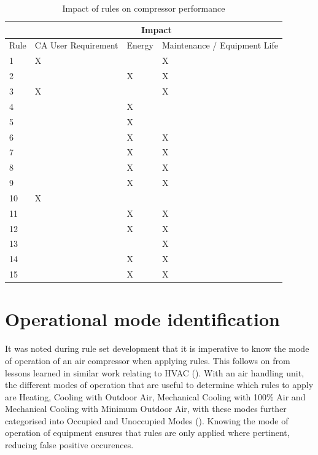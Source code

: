 \begin{table}[htbp]
  \centering
  \caption{Impact of rules on compressor performance}
    \begin{tabular}{p{}p{}p{}p{}}
    \toprule
          & \multicolumn{3}{c}{Impact} \\
    \midrule
    Rule  & CA User Requirement & Energy & Maintenance / Equipment Life \\
    1     & X     &       & X \\
    2     &       & X     & X \\
    3     & X     &       & X \\
    4     &       & X     &  \\
    5     &       & X     &  \\
    6     &       & X     & X \\
    7     &       & X     & X \\
    8     &       & X     & X \\
    9     &       & X     & X \\
    10    & X     &       &  \\
    11    &       & X     & X \\
    12    &       & X     & X \\
    13    &       &       & X \\
    14    &       & X     & X \\
    15    &       & X     & X \\
    \bottomrule
    \end{tabular}%
  \label{tab:ruleimpact}%
\end{table}%

\bigskip

\section{Operational mode identification}
\label{sec:modeidentification}
It was noted during rule set development that it is imperative to know the mode of operation of an air compressor when applying rules. This follows on from lessons learned in similar work relating to HVAC (\cite{Bruton2014}). With an air handling unit, the different modes of operation that are useful to determine which rules to apply are Heating, Cooling with Outdoor Air, Mechanical Cooling with 100\% Air and Mechanical Cooling with Minimum Outdoor Air, with these modes further categorised into Occupied and Unoccupied Modes (\cite{House2001}). Knowing the mode of operation of equipment ensures that rules are only applied where pertinent, reducing false positive occurences.

